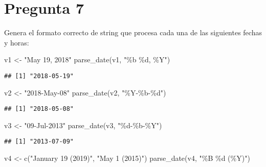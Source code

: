 \documentclass[
]{article}
\newenvironment{Shaded}{\begin{snugshade}}{\end{snugshade}}
\newcommand{\FunctionTok}[1]{\textcolor[rgb]{0.00,0.00,0.00}{#1}}
\newcommand{\NormalTok}[1]{#1}
\newcommand{\OtherTok}[1]{\textcolor[rgb]{0.56,0.35,0.01}{#1}}
\newcommand{\StringTok}[1]{\textcolor[rgb]{0.31,0.60,0.02}{#1}}
\begin{document}
\hypertarget{pregunta-7}{%
\section{Pregunta 7}\label{pregunta-7}}

Genera el formato correcto de string que procesa cada una de las
siguientes fechas y horas:

\begin{Shaded}
\begin{Highlighting}[]
\NormalTok{v1 }\OtherTok{\textless{}{-}} \StringTok{"May 19, 2018"}
\FunctionTok{parse\_date}\NormalTok{(v1, }\StringTok{"\%b \%d, \%Y"}\NormalTok{)}
\end{Highlighting}
\end{Shaded}

\begin{verbatim}
## [1] "2018-05-19"
\end{verbatim}

\begin{Shaded}
\begin{Highlighting}[]
\NormalTok{v2 }\OtherTok{\textless{}{-}} \StringTok{"2018{-}May{-}08"}
\FunctionTok{parse\_date}\NormalTok{(v2, }\StringTok{"\%Y{-}\%b{-}\%d"}\NormalTok{)}
\end{Highlighting}
\end{Shaded}

\begin{verbatim}
## [1] "2018-05-08"
\end{verbatim}

\begin{Shaded}
\begin{Highlighting}[]
\NormalTok{v3 }\OtherTok{\textless{}{-}} \StringTok{"09{-}Jul{-}2013"}
\FunctionTok{parse\_date}\NormalTok{(v3, }\StringTok{"\%d{-}\%b{-}\%Y"}\NormalTok{)}
\end{Highlighting}
\end{Shaded}

\begin{verbatim}
## [1] "2013-07-09"
\end{verbatim}

\begin{Shaded}
\begin{Highlighting}[]
\NormalTok{v4 }\OtherTok{\textless{}{-}} \FunctionTok{c}\NormalTok{(}\StringTok{"January 19 (2019)"}\NormalTok{, }\StringTok{"May 1 (2015)"}\NormalTok{)}
\FunctionTok{parse\_date}\NormalTok{(v4, }\StringTok{"\%B \%d (\%Y)"}\NormalTok{)}
\end{Highlighting}
\end{Shaded}
\end{document}
